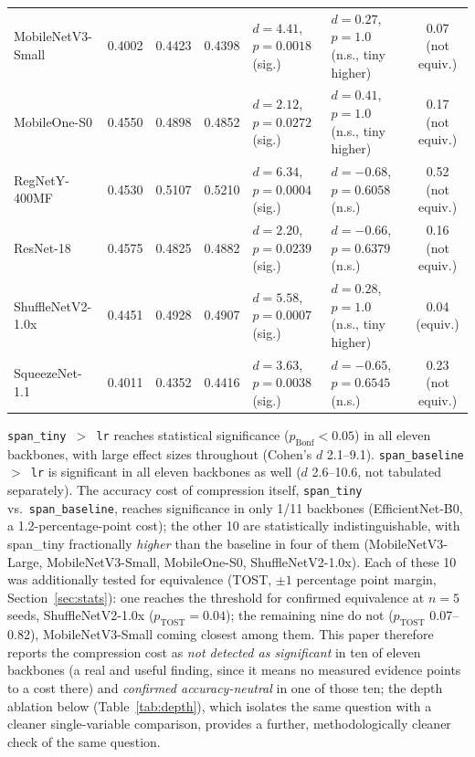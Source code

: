 \documentclass[11pt]{article}
\begin{document}
\begin{table}[H]
\begin{threeparttable}
{\begin{tabular}{lcccllc}
MobileNetV3-Small   & 0.4002 & 0.4423 & 0.4398 & $d{=}4.41$, $p{=}0.0018$ (sig.) & $d{=}0.27$, $p{=}1.0$ (n.s., tiny higher) & 0.07 (not equiv.) \\
MobileOne-S0        & 0.4550 & 0.4898 & 0.4852 & $d{=}2.12$, $p{=}0.0272$ (sig.) & $d{=}0.41$, $p{=}1.0$ (n.s., tiny higher) & 0.17 (not equiv.) \\
RegNetY-400MF       & 0.4530 & 0.5107 & 0.5210 & $d{=}6.34$, $p{=}0.0004$ (sig.) & $d{=}{-}0.68$, $p{=}0.6058$ (n.s.) & 0.52 (not equiv.) \\
ResNet-18           & 0.4575 & 0.4825 & 0.4882 & $d{=}2.20$, $p{=}0.0239$ (sig.) & $d{=}{-}0.66$, $p{=}0.6379$ (n.s.) & 0.16 (not equiv.) \\
ShuffleNetV2-1.0x   & 0.4451 & 0.4928 & 0.4907 & $d{=}5.58$, $p{=}0.0007$ (sig.) & $d{=}0.28$, $p{=}1.0$ (n.s., tiny higher) & 0.04 (equiv.) \\
SqueezeNet-1.1      & 0.4011 & 0.4352 & 0.4416 & $d{=}3.63$, $p{=}0.0038$ (sig.) & $d{=}{-}0.65$, $p{=}0.6545$ (n.s.) & 0.23 (not equiv.) \\
\bottomrule
\end{tabular}%
}
\end{threeparttable}
\end{table}

\texttt{span\_tiny $>$ lr} reaches statistical significance ($p_{\text{Bonf}} < 0.05$) in all eleven backbones, with large effect sizes throughout (Cohen's $d$ 2.1--9.1). \texttt{span\_baseline $>$ lr} is significant in all eleven backbones as well ($d$ 2.6--10.6, not tabulated separately). The accuracy cost of compression itself, \texttt{span\_tiny} vs.\ \texttt{span\_baseline}, reaches significance in only 1/11 backbones (EfficientNet-B0, a 1.2-percentage-point cost); the other 10 are statistically indistinguishable, with span\_tiny fractionally \emph{higher} than the baseline in four of them (MobileNetV3-Large, MobileNetV3-Small, MobileOne-S0, ShuffleNetV2-1.0x). Each of these 10 was additionally tested for equivalence (TOST, $\pm 1$ percentage point margin, Section~\ref{sec:stats}): one reaches the threshold for confirmed equivalence at $n=5$ seeds, ShuffleNetV2-1.0x ($p_{\text{TOST}}{=}0.04$); the remaining nine do not ($p_{\text{TOST}}$ 0.07--0.82), MobileNetV3-Small coming closest among them. This paper therefore reports the compression cost as \emph{not detected as significant} in ten of eleven backbones (a real and useful finding, since it means no measured evidence points to a cost there) and \emph{confirmed accuracy-neutral} in one of those ten; the depth ablation below (Table~\ref{tab:depth}), which isolates the same question with a cleaner single-variable comparison, provides a further, methodologically cleaner check of the same question.
\end{document}
